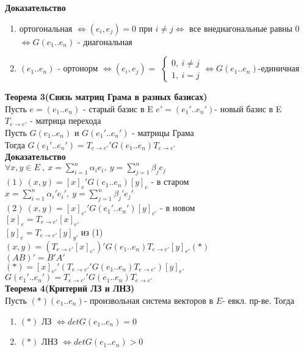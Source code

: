 \textbf{Доказательство} 
\begin{enumerate}
 \item ортогональная $\Leftrightarrow (e_i,e_j)=0$ при $i \ne j \Leftrightarrow$ все внедиагональные равны 0 $\Leftrightarrow G(e_1..e_n)$ - диагональная
 \item $(e_1..e_n)$ - ортонорм $\Leftrightarrow (e_i,e_j)=$ $\left\{ \begin{matrix}
\mbox{$0, \ i \ne j $} \\
\mbox{$1, \ i=j$}
\end{matrix}\right. \Leftrightarrow G(e_1..e_n)$-единичная 
\end{enumerate}
\textbf{Теорема 3(Связь матриц Грама в разных базисах)} \\
Пусть $e=(e_1..e_n)$ - старый базис в E  $e'=(e_1'..e_n')$- новый базис в E \\
$T_{e \to e'}$ - матрица перехода \\
Пусть $G(e_1..e_n)$ и $G(e_1'..e_n')$ - матрицы Грама \\
Тогда $G(e_1'..e_n')=T_{e \to e'}' G(e_1..e_n)T_{e \to e'}$ \\
\textbf{Доказательство} \\
$\forall x,y \in E\ , \ x=\sum \limits_{i=1}^n {\alpha_i e_i} , \ y=\sum \limits_{j=1}^n {\beta_j e_j} $ \\
$(1) \ (x,y)=[x]_e'G(e_1..e_n)[y]_e$ - в старом \\
$x=\sum \limits_{i=1}^n {\alpha_i' e_i'} , \ y=\sum \limits_{j=1}^n {\beta_j' e_j'}$ \\
$(2) \ (x,y)=[x]_{e'}' G(e_1'..e_n') [y]_{e'} $ - в новом \\
$[x]_e=T_{e \to e'} [x]_{e'}$ \\
$[y]_e=T_{e \to e'} [y]_{y'}$ из (1) \\
$(x,y)=(T_{e \to e'}[x]_{e'})'G(e_1..e_n)T_{e \to e'} [y]_{e'} (*)$\\
$(AB)'=B'A'$ \\
$(*)=[x]_{e'}'(T_{e \to e'}'G(e_1..e_n)T_{e \to e'})[y]_{e'}$ \\
$G(e_1'..e_n')=T_{e \to e'}'G(e_1..e_n)T_{e \to e'}$ \\
\textbf{Теорема 4(Критерий ЛЗ и ЛНЗ)} \\
Пусть $(*)(e_1..e_n)$- произвольная система векторов в $E$- евкл. пр-ве. Тогда
\begin{enumerate}
 \item $(*)$ ЛЗ $\Leftrightarrow detG(e_1..e_n)=0$
 \item $(*)$ ЛНЗ $\Leftrightarrow detG(e_1..e_n)>0$ 
\end{enumerate}
